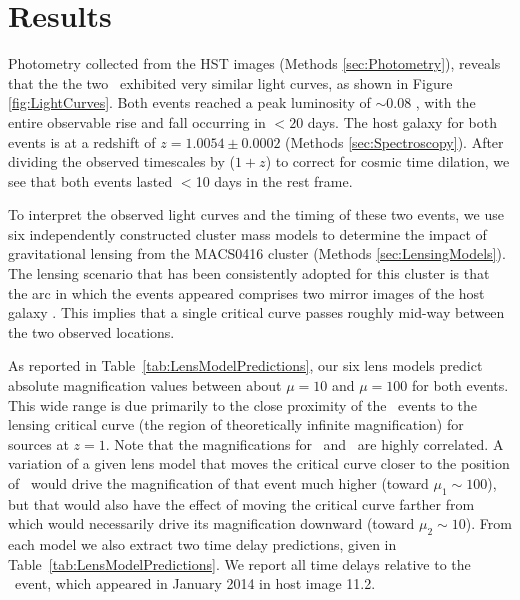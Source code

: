 \section{Results}\label{sec:Results}

Photometry collected from the HST images (Methods
\ref{sec:Photometry}), reveals that the the two \spock\ exhibited very
similar light curves, as shown in Figure \ref{fig:LightCurves}.  Both
events reached a peak luminosity of $\sim$0.08 \microjansky, with the
entire observable rise and fall occurring in $<20$ days.  The host
galaxy for both \spock events is at a redshift of $z=1.0054\pm0.0002$
(Methods \ref{sec:Spectroscopy}).  After dividing the observed
timescales by ($1+z$) to correct for cosmic time dilation, we see that
both events lasted $<$10 days in the rest frame.

To interpret the observed light curves and the timing of these two
events, we use six independently constructed cluster mass models to
determine the impact of gravitational lensing from the MACS0416
cluster (Methods \ref{sec:LensingModels}).  The lensing scenario that
has been consistently adopted for this cluster is that the arc in
which the \spock events appeared comprises two mirror images of the
host galaxy \citep[labeled 11.1 and 11.2 in
  Figure~\ref{fig:SpockDetectionImages};][]{Zitrin:2013a, Jauzac:2014,
  Johnson:2014, Richard:2014, Diego:2015a, Grillo:2015a, Hoag:2016,
  Sebesta:2016}.  This implies that a single critical curve passes
roughly mid-way between the two observed \spock locations.

As reported in Table~\ref{tab:LensModelPredictions}, our six lens
models predict absolute magnification values between about $\mu=10$
and $\mu=100$ for both events.  This wide range is due primarily to
the close proximity of the \spock\ events to the lensing critical
curve (the region of theoretically infinite magnification) for sources
at $z=1$.  Note that the magnifications for \spockone\ and
\spocktwo\ are highly correlated.  A variation of a given lens model
that moves the critical curve closer to the position of
\spockone\ would drive the magnification of that event much higher
(toward $\mu_1\sim100$), but that would also have the effect of moving
the critical curve farther from \spocktwo\, which would necessarily
drive its magnification downward (toward $\mu_2\sim10$). From each
model we also extract two time delay predictions, given in
Table~\ref{tab:LensModelPredictions}.  We report all time delays
relative to the \spockone\ event, which appeared in January 2014 in
host image 11.2.

